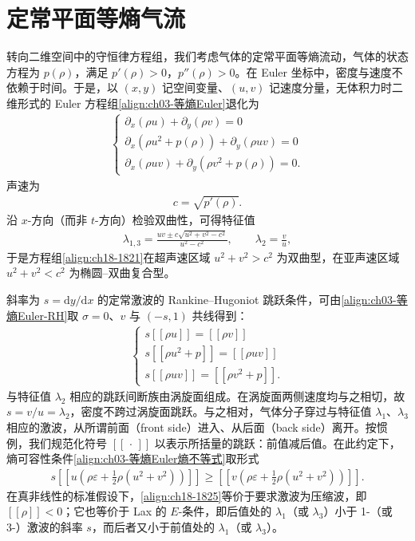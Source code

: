 \documentclass[../../main.tex]{subfiles}
\begin{document}
\section{定常平面等熵气流}\label{section:ch18-定常平面等熵气流}

转向二维空间中的守恒律方程组，我们考虑气体的定常平面等熵流动，气体的状态方程为 $p(\rho)$，满足 $p'(\rho)>0$，$p''(\rho)>0$。在 Euler 坐标中，密度与速度不依赖于时间。于是，以 $(x,y)$ 记空间变量、$(u,v)$ 记速度分量，无体积力时二维形式的 Euler 方程组\eqref{align:ch03-等熵Euler}退化为
\begin{align}
\begin{cases}
\partial_x(\rho u)+\partial_y(\rho v)=0\\
\partial_x(\rho u^2+p(\rho))+\partial_y(\rho uv)=0\\
\partial_x(\rho uv)+\partial_y(\rho v^2+p(\rho))=0.
\end{cases}
\label{align:ch18-1821}
\end{align}
声速为
\begin{align}
c=\sqrt{p'(\rho)}.
\label{align:ch18-1822}
\end{align}
沿 $x$-方向（而非 $t$-方向）检验双曲性，可得特征值
\begin{align}
\lambda_{1,3}=\frac{uv\pm c\sqrt{u^2+v^2-c^2}}{u^2-c^2},\qquad \lambda_2=\frac{v}{u},
\label{align:ch18-1823}
\end{align}
于是方程组\eqref{align:ch18-1821}在超声速区域 $u^2+v^2>c^2$ 为双曲型，在亚声速区域 $u^2+v^2<c^2$ 为椭圆--双曲复合型。

斜率为 $s=\mathrm{d}y/\mathrm{d}x$ 的定常激波的 Rankine--Hugoniot 跳跃条件，可由\eqref{align:ch03-等熵Euler-RH}取 $\sigma=0$、$v$ 与 $(-s,1)$ 共线得到：
\begin{align}
\begin{cases}
s[\![\rho u]\!]=[\![\rho v]\!]\\
s[\![\rho u^2+p]\!]=[\![\rho uv]\!]\\
s[\![\rho uv]\!]=[\![\rho v^2+p]\!].
\end{cases}
\label{align:ch18-1824}
\end{align}
与特征值 $\lambda_2$ 相应的跳跃间断族由涡旋面组成。在涡旋面两侧速度均与之相切，故 $s=v/u=\lambda_2$，密度不跨过涡旋面跳跃。与之相对，气体分子穿过与特征值 $\lambda_1$、$\lambda_3$ 相应的激波，从所谓前面（front side）进入、从后面（back side）离开。按惯例，我们规范化符号 $[\![\,\cdot\,]\!]$ 以表示所括量的跳跃：前值减后值。在此约定下，熵可容性条件\eqref{align:ch03-等熵Euler熵不等式}取形式
\begin{align}
s\left[\!\left[u\left(\rho\varepsilon+\frac12\rho(u^2+v^2)\right)\right]\!\right]\geqslant
\left[\!\left[v\left(\rho\varepsilon+\frac12\rho(u^2+v^2)\right)\right]\!\right].
\label{align:ch18-1825}
\end{align}
在真非线性的标准假设下，\eqref{align:ch18-1825}等价于要求激波为压缩波，即 $[\![\rho]\!]<0$；它也等价于 Lax 的 $E$-条件，即后值处的 $\lambda_1$（或 $\lambda_3$）小于 1-（或 3-）激波的斜率 $s$，而后者又小于前值处的 $\lambda_1$（或 $\lambda_3$）。
\end{document}
